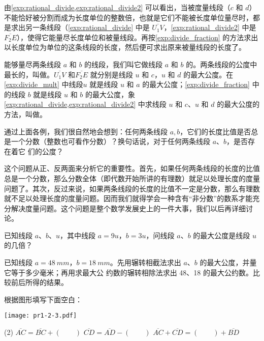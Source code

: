 \bigskip
由\cref{exp:rational_divide,exp:rational_divide2} 可以看出，当被度量线段（$c$ 和 $d$）不能恰好被分割而成为长度单位的整数倍，也就是它们不能被长度单位量尽时，都是求出另一条线段（\cref{exp:rational_divide} 中是 $\overline{U_1V}$，\cref{exp:rational_divide2} 中是 $\overline{F_2E}$），使得它能量尽长度单位和被量线段。再按\cref{exp:divide_fraction} 的方法求出以长度单位为单位的这条线段的长度，然后便可求出原来被量线段的长度了。

能够量尽两条线段 $a$ 和 $b$ 的线段，我们叫它做线段 $a$ 和 $b$ 的。两条线段的公度中最长的，叫做。$\overline{U_1V}$ 和$\overline{F_2E}$ 就分别是线段 $u$ 和 $c$，$u$ 和 $d$ 的最大公度。在\cref{exp:divide_mult} 中线段$u$ 就是线段 $u$ 和 $a$ 的最大公度；\cref{exp:divide_fraction} 中的线段 $b$ 就是线段 $u$ 和 $b$ 的最大公度，象\cref{exp:rational_divide,exp:rational_divide2} 中求线段 $u$ 和 $c$、$u$ 和 $d$ 的最大公度的方法，叫做。

通过上面各例，我们很自然地会想到：任何两条线段 $a, b$，它们的长度比值是否总是一个分数（整数也可看作分数）？换句话说，对于任何两条线段 $a$、$b$，是否存在着它
们的公度？

这个问题从正、反两面来分析它的重要性。首先，如果任何两条线段的长度的比值总是一个分数，那么分数全体（即代数开始所讲的有理数）就足以处理长度的度量问题了。其次，反过来说，如果两条线段的长度的比值不一定是分数，那么有理数就不足以处理长度的度量问题。因而我们就得学会一种含有“非分数”的数系才能充分解决度量问题。这个问题是整个数学发展史上的一件大事，我们以后再详细讨论。

\begin{Practice}
\begin{question}
	\item 已知线段 $a$、$b$、$u$，其中线段 $a=9u$，$b=3u$，问线段 $a$、$b$ 的最大公度是线段 $u$ 的几倍？
	\item 已知线段 $a=\qty{48}{mm}$，$b=\qty{18}{mm}$。先用辗转相截法求出	$a$、$b$ 的最大公度，并量它等于多少毫米；再用求最大公	约数的辗转相除法求出 48、18 的最大公约数。比较前后所得的结果。
	\item 根据图形填写下面空白：
	\begin{figurehere}
		\texttt{[image: pr1-2-3.pdf]}
	\end{figurehere}
	\begin{tasks}(2)
		\task $\overline{AC}=\overline{BC}+(\qquad)$	
		\task	$\overline{CD}=\overline{AD}-(\qquad)$	
		\task $\overline{AC}+\overline{CD}=(\qquad)+\overline{BD}$
	\end{tasks}
\end{question}
\end{Practice}

